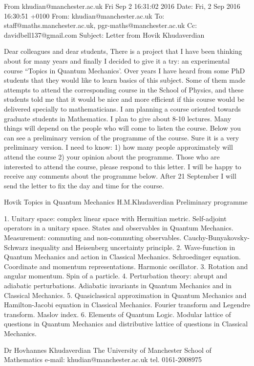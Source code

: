 From khudian@manchester.ac.uk Fri Sep  2 16:31:02 2016
Date: Fri, 2 Sep 2016 16:30:51 +0100
From: khudian@manchester.ac.uk
To: staff@maths.manchester.ac.uk, pgr-maths@manchester.ac.uk
Cc: davidbell137@gmail.com
Subject: Letter from Hovik Khudaverdian


             Dear colleagues and dear students,
    There is a project that I have been thinking about for many years and
finally I decided to give it a try:
an experimental course ``Topics in Quantum Mechanics'.
    Over years I have heard from some PhD students that they would like to
learn basics of this subject. Some of them made attempts to attend the
corresponding course in the School of Physics, and these students told
me that it would be nice and more efficient if this course would be
delivered specially to mathematicians.
    I am planning a course oriented towards graduate students in
Mathematics. I plan to give about 8-10 lectures. Many things will depend
on the people who will come to listen the course.
    Below you can see a preliminary version of the programme of the course.
Sure it is a very preliminary version.
 	I need to know:
1) how many people approximately  will attend the course
2) your opinion about the programme.
    Those who are interested to attend the course, please respond to this
letter. I will be happy to receive any comments about the programme below.
 	After 21 September I will send the letter to fix the day
and time for the course.

                         Hovik
                   Topics in Quantum Mechanics
                   H.M.Khudaverdian
   Preliminary programme

 	1. Unitary space: complex linear space with Hermitian metric.
Self-adjoint operators in a unitary space. States and observables in
Quantum Mechanics. Measurement: commuting and non-commuting observables.
Cauchy-Bunyakovsky-Schwarz inequality and Heisenberg uncertainty principle.
 	2. Wave-function in Quantum Mechanics and action in Classical
Mechanics. Schroedinger equation. Coordinate and momentum
representations. Harmonic oscillator.
 	3. Rotation and angular momentum. Spin of a particle.
 	4. Perturbation theory: abrupt and adiabatic perturbations.
Adiabatic invariants in Quantum Mechanics and in Classical Mechanics.
 	5. Quasiclassical approximation in Quantum Mechanics and
Hamilton-Jacobi equation in Classical Mechanics. Fourier transform and
Legendre transform. Maslov index.
 	6. Elements of Quantum Logic. Modular lattice of questions
in Quantum Mechanics and distributive lattice of
questions in  Classical Mechanics.




                                      Dr Hovhannes Khudaverdian
                                      The University of Manchester
                                         School of Mathematics
                                     e-mail: khudian@manchester.ac.uk
                                          tel. 0161-2008975



